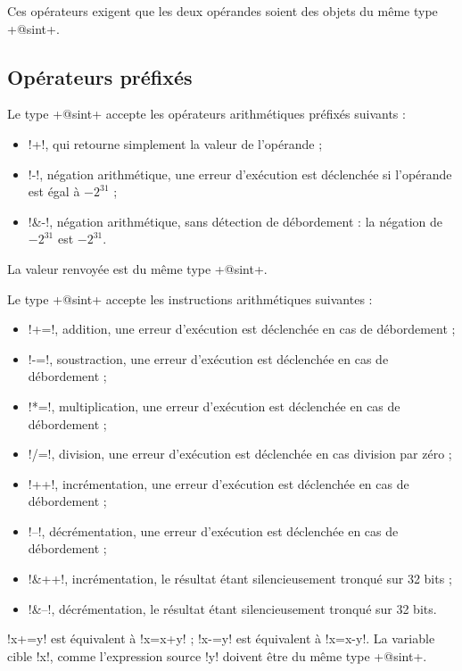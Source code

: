 Ces opérateurs exigent que les deux opérandes soient des objets du même type \ggst+@sint+.

\subsection{Opérateurs préfixés}
Le type \ggst+@sint+ accepte les opérateurs arithmétiques préfixés suivants :
\begin{itemize}
  \item \ggst!+!, qui retourne simplement la valeur de l'opérande ;
  \item \ggst!-!, négation arithmétique, une erreur d'exécution est déclenchée si l'opérande est égal à $-2^{31}$ ;
  \item \ggst!&-!, négation arithmétique, sans détection de débordement : la négation de $-2^{31}$ est $-2^{31}$.
\end{itemize}

La valeur renvoyée est du même type  \ggst+@sint+.



Le type \ggst+@sint+ accepte les instructions arithmétiques suivantes :
\begin{itemize}
  \item \ggst!+=!, addition, une erreur d'exécution est déclenchée en cas de débordement ;
  \item \ggst!-=!, soustraction, une erreur d'exécution est déclenchée en cas de débordement ;
  \item \ggst!*=!, multiplication, une erreur d'exécution est déclenchée en cas de débordement ;
  \item \ggst!/=!, division, une erreur d'exécution est déclenchée en cas division par zéro ;
  \item \ggst!++!, incrémentation, une erreur d'exécution est déclenchée en cas de débordement ;
  \item \ggst!--!, décrémentation, une erreur d'exécution est déclenchée en cas de débordement ;
  \item \ggst!&++!, incrémentation, le résultat étant silencieusement tronqué sur 32 bits ;
  \item \ggst!&--!, décrémentation, le résultat étant silencieusement tronqué sur 32 bits.
\end{itemize}

\ggst!x+=y! est équivalent à \ggst!x=x+y! ; \ggst!x-=y! est équivalent à \ggst!x=x-y!.
La variable cible \ggst!x!, comme l'expression source \ggst!y! doivent être du même type \ggst+@sint+.

